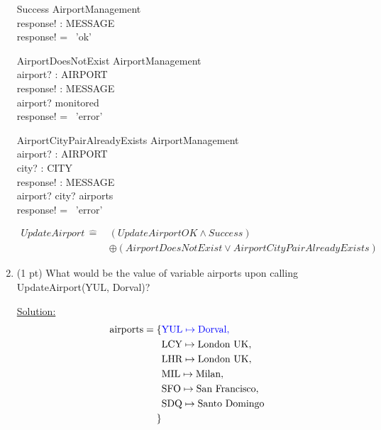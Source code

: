 \documentclass[12pt]{article}
\begin{document}
\begin{spacing}{1.5}
\begin{enumerate}
		      \begin{schema}{Success}
		      	\Xi AirportManagement \\
		      	response! : MESSAGE \\
		      	\where
		      	response! = \, 'ok' \\
		      \end{schema}
		      
		      \begin{schema}{AirportDoesNotExist}
		      	\Xi AirportManagement \\
		      	airport? : AIRPORT \\
		      	response! : MESSAGE \\
		      	\where
		      	airport? \notin monitored \\
		      	response! = \, 'error' \\
		      \end{schema}
		      
		      \begin{schema}{AirportCityPairAlreadyExists}
		      	\Xi AirportManagement \\
		      	airport? : AIRPORT \\
		      	city? : CITY \\
		      	response! : MESSAGE \\
		      	\where
		      	airport? \mapsto city? \in airports \\
		      	response! = \, 'error' \\
		      \end{schema}
		      \begin{align*}
		      	UpdateAirport \, \hat{=} \, & (UpdateAirportOK \land Success)                                \\
		      	                            & \oplus (AirportDoesNotExist \lor AirportCityPairAlreadyExists) 
		      \end{align*}
		      
		\item (1 pt) What would be the value of variable airports upon calling UpdateAirport(YUL, Dorval)?
		              
		      \underline{Solution:}        
		      \begin{align*}
		      	\text{airports} = \{
		      	  & \textcolor{blue}{\text{YUL} \mapsto \text{Dorval},} \\
		      	  & \text{LCY} \mapsto \text{London UK},                \\
		      	  & \text{LHR} \mapsto \text{London UK},                \\
		      	  & \text{MIL} \mapsto \text{Milan},                    \\
		      	  & \text{SFO} \mapsto \text{San Francisco},            \\
		      	  & \text{SDQ} \mapsto \text{Santo Domingo}             \\
		      	\}
		      \end{align*}
		      

\end{enumerate}
\end{spacing}
\end{document}

